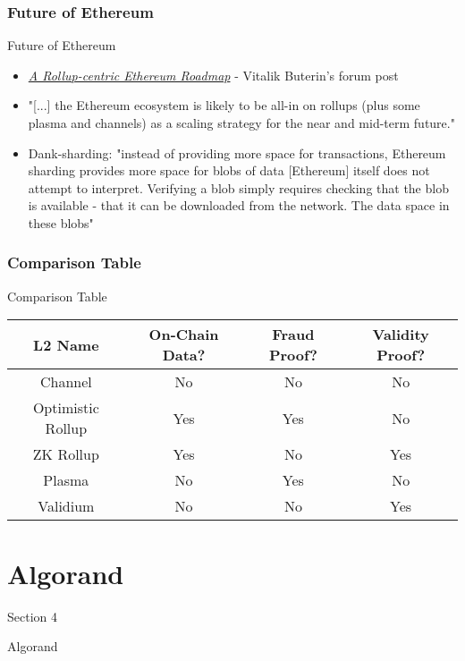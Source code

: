 \documentclass[aspectratio=169,xcolor=dvipsnames]{beamer}
\begin{document}
\subsubsection{Future of Ethereum}
\begin{frame}{Future of Ethereum}
\begin{itemize}
    \item \textit{\href{https://ethereum-magicians.org/t/a-rollup-centric-ethereum-roadmap/4698/1}{A Rollup-centric Ethereum Roadmap}} - Vitalik Buterin's forum post
    \item "[...] the Ethereum ecosystem is likely to be all-in on rollups (plus some plasma and channels) as a scaling strategy for the near and mid-term future."
    \item Dank-sharding: "instead of providing more space for transactions, Ethereum sharding provides more space for blobs of data [Ethereum] itself does not attempt to interpret. Verifying a blob simply requires checking that the blob is available - that it can be downloaded from the network. The data space in these blobs"
\end{itemize}
\end{frame}
\subsubsection{Comparison Table}
\begin{frame}{Comparison Table}
\begin{tabular}{|c|c|c|c|}
\hline
    L2 Name & On-Chain Data? & Fraud Proof? & Validity Proof? \\ 
\hline
    Channel &  No & No & No \\
\hline
    Optimistic Rollup & Yes & Yes & No \\
\hline
    ZK Rollup & Yes & No & Yes \\
\hline
    Plasma & No & Yes & No \\ 
\hline
    Validium & No & No & Yes \\
\hline
\end{tabular}
\end{frame}



\section{Algorand}
\begin{frame}{Section 4}
    \Huge{\centerline{Algorand}}
\end{frame}
\end{document}
